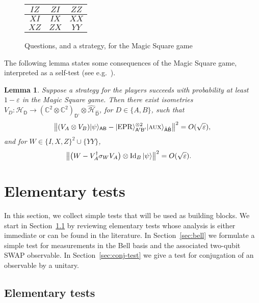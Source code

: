 \documentclass[11pt]{article}
\newtheorem{lemma}[theorem]{Lemma}
\theoremstyle{remark}
\theoremstyle{definition}
\newcommand{\ket}[1]{|#1\rangle}
\newcommand{\Id}{\ensuremath{\mathop{\rm Id}\nolimits}}
\newcommand{\reg}[1]{{\textsf{#1}}}
\newcommand{\C}{\ensuremath{\mathbb{C}}}
\newcommand{\mH}{\mathcal{H}}
\newcommand{\eps}{\varepsilon}
\newcommand{\EPR}{{\rm EPR}}
\newcommand{\aux}{\textsc {aux}}
\begin{document}
\begin{figure}[H]
\begin{center}
\begin{tabular}{|c|c|c|}
\hline
$IZ$ & $ZI$ & $ZZ$ \\
\hline
$XI$ & $IX$ & $XX$ \\
\hline
$XZ$ & $ZX$ & $YY$\\
\hline
\end{tabular}
\end{center}
\caption{Questions, and a strategy, for the Magic Square game}
\label{fig:ms}
\end{figure}

The following lemma states some consequences of the Magic Square game, interpreted as a self-test (see e.g.~\cite{WBMS16}). 

\begin{lemma}\label{lem:ms-rigid}
Suppose a strategy for the players succeeds with probability at least $1-\eps$ in the Magic Square game. Then there exist  isometries $V_D:\mH_\reg{D} \to (\C^2\otimes \C^2)_{\reg{D'}}\otimes \hat{\mH}_{\hat{\reg{D}}}$, for $D\in\{A,B\}$, such that
$$\big\| (V_A \otimes V_B) \ket{\psi}_{\reg{AB}} - \ket{\EPR}_{\reg{A}'\reg{B}'}^{\otimes 2} \ket{\aux}_{\hat{\reg{A}}\hat{\reg{B}}} \big\|^2 = O(\sqrt{\eps}),$$
and for $W\in \{I,X,Z\}^2 \cup \{YY\}$,
\begin{align*}
\big\| \big(W -V_A^\dagger \sigma_W V_A\big) \otimes \Id_B \ket{\psi} \big\|^2 &= O(\sqrt{\eps}).
\end{align*}
\end{lemma}

\section{Elementary tests}
\label{sec:clifford-test}

In this section, we collect simple tests that will be used as building blocks. We start in Section~\ref{sec:elementary} by reviewing elementary tests whose analysis is either immediate or can be found in the literature. In Section~\ref{sec:bell} we formulate a simple test for measurements in the Bell basis and the associated two-qubit SWAP observable. In Section~\ref{sec:conj-test} we give a test for conjugation of an observable by a unitary. 

\subsection{Elementary tests}
\label{sec:elementary}
\end{document}
